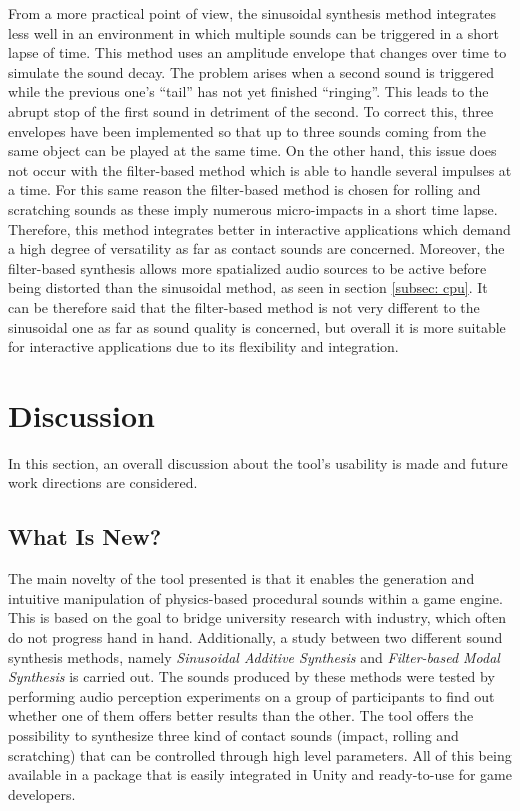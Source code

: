 From a more practical point of view, the sinusoidal synthesis method integrates less well in an environment in which multiple sounds can be triggered in a short lapse of time. This method uses an amplitude envelope that changes over time to simulate the sound decay. The problem arises when a second sound is triggered while the previous one's ``tail'' has not yet finished ``ringing''. This leads to the abrupt stop of the first sound in detriment of the second. To correct this, three envelopes have been implemented so that up to three sounds coming from the same object can be played at the same time. On the other hand, this issue does not occur with the filter-based method which is able to handle several impulses at a time. For this same reason the filter-based method is chosen for rolling and scratching sounds as these imply numerous micro-impacts in a short time lapse. Therefore, this method integrates better in interactive applications which demand a high degree of versatility as far as contact sounds are concerned. Moreover,  the filter-based synthesis allows more spatialized audio sources to be active before being distorted than the sinusoidal method, as seen in section \ref{subsec: cpu}. It can be therefore said that the filter-based method is not very different to the sinusoidal one as far as sound quality is concerned, but overall it is more suitable for interactive applications due to its flexibility and integration.


\section{Discussion}
In this section, an overall discussion about the tool's usability is made and future work directions are considered.

\subsection{What Is New?}
The main novelty of the tool presented is that it enables the generation and intuitive manipulation of physics-based procedural sounds within a game engine. This is based on the goal to bridge university research with industry, which often do not progress hand in hand.
Additionally, a study between two different sound synthesis methods, namely \textit{Sinusoidal Additive Synthesis} and \textit{Filter-based Modal Synthesis} is carried out. The sounds produced by these methods were tested by performing audio perception experiments on a group of participants to find out whether one of them offers better results than the other.
The tool offers the possibility to synthesize three kind of contact sounds (impact, rolling and scratching) that can be controlled through high level parameters. All of this being available in a package that is easily integrated in Unity\textsuperscript{\textregistered} and ready-to-use for game developers. 

